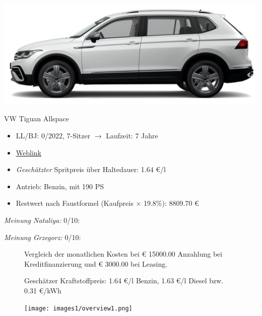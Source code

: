 \documentclass[landscape, DIV=99, 14pt]{scrartcl}
\begin{document}
\pagebreak
\begin{center}
\includegraphics[width=0.9\columnwidth]{cars/vw-tiguan-diesel.png}

VW Tiguan Allspace
\end{center}

\begin{itemize}
    \item LL/BJ: 0/2022, 7-Sitzer $\rightarrow$ Laufzeit: 7 Jahre
    \item \href{https://www.volkswagen.de/de/konfigurator.html/__app/der-neue-tiguan-allspace/der-tiguan-allspace---standardmodelle/elegance.app?buildabilityStatus-app=buildable&category-app=private&carlineId-app=31160&salesGroupId-app=32700&trimName-app=Elegance&modelId-app=BJ247T%24GYORYOR&modelVersion-app=2&modelYear-app=2022&exteriorId-app=F14+0Q0Q&interiorId-app=F56+++++BG&options-app=GWBAWBA-GPG4PG4-MAHV1M6-GPFCPFC-GRBDRBD-MKSUKA2}{Weblink}
    \item \emph{Gesch\"atzter} Spritpreis \"uber Haltedauer: 1.64 \euro{}/l
    \item Antrieb: Benzin, mit 190 PS
    \item Restwert nach Faustformel (Kaufpreis $\times$ 19.8\%): 8809.70 \euro{}
\end{itemize}

\begin{small}
\emph{Meinung Nataliya:} 0/10: 
        
\emph{Meinung Grzegorz:} 0/10: 
\end{small}

\pagebreak



\pagebreak

\onecolumn
\begin{figure}
\centering
Vergleich der monatlichen Kosten bei \euro{} 15000.00 Anzahlung bei Kreditfinanzierung und \euro{} 3000.00 bei Leasing.

Gesch\"atzer Kraftstoffpreis: 1.64 \euro{}/l Benzin, 1.63 \euro{}/l Diesel bzw. 0.31 \euro{}/kWh


\vspace{1em}
\texttt{[image: images1/overview1.png]}
\end{figure}
\vfill 
\end{document}
